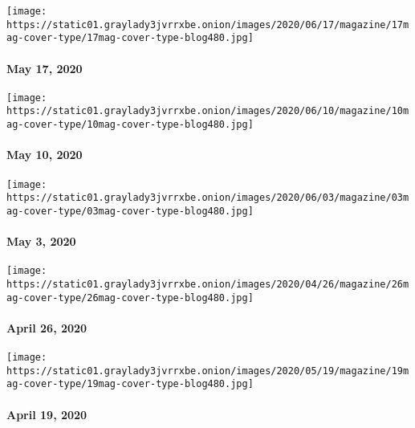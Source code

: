 \href{https://www.nytimes3xbfgragh.onion/issue/magazine/2020/05/24/the-51720-issue}{}

\texttt{[image: https://static01.graylady3jvrrxbe.onion/images/2020/06/17/magazine/17mag-cover-type/17mag-cover-type-blog480.jpg]}

\hypertarget{may-17-2020}{%
\paragraph{May 17, 2020}\label{may-17-2020}}

\href{https://www.nytimes3xbfgragh.onion/issue/magazine/2020/05/07/the-51020-issue}{}

\texttt{[image: https://static01.graylady3jvrrxbe.onion/images/2020/06/10/magazine/10mag-cover-type/10mag-cover-type-blog480.jpg]}

\hypertarget{may-10-2020}{%
\paragraph{May 10, 2020}\label{may-10-2020}}

\href{https://www.nytimes3xbfgragh.onion/issue/magazine/2020/04/30/the-5320-issue}{}

\texttt{[image: https://static01.graylady3jvrrxbe.onion/images/2020/06/03/magazine/03mag-cover-type/03mag-cover-type-blog480.jpg]}

\hypertarget{may-3-2020}{%
\paragraph{May 3, 2020}\label{may-3-2020}}

\href{https://www.nytimes3xbfgragh.onion/issue/magazine/2020/04/23/the-42620-issue}{}

\texttt{[image: https://static01.graylady3jvrrxbe.onion/images/2020/04/26/magazine/26mag-cover-type/26mag-cover-type-blog480.jpg]}

\hypertarget{april-26-2020}{%
\paragraph{April 26, 2020}\label{april-26-2020}}

\href{https://www.nytimes3xbfgragh.onion/issue/magazine/2020/04/17/the-41920-issue}{}

\texttt{[image: https://static01.graylady3jvrrxbe.onion/images/2020/05/19/magazine/19mag-cover-type/19mag-cover-type-blog480.jpg]}

\hypertarget{april-19-2020}{%
\paragraph{April 19, 2020}\label{april-19-2020}}

